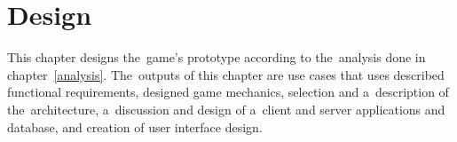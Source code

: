 \chapter{Design}
\label{chapter:design}

This chapter designs the~game's prototype according to the~analysis done in chapter~\ref{analysis}.
The~outputs of this chapter are use cases that uses described functional requirements, designed game mechanics, selection and a~description of the~architecture, a~discussion and design of a~client and server applications and database, and creation of user interface design.


\pagebreak






